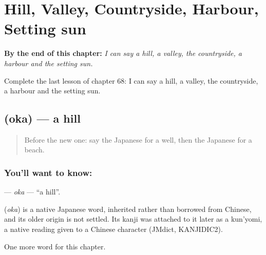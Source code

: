 
\chapter{Hill, Valley, Countryside, Harbour, Setting sun}
\label{ch:ja-hill-valley-countryside-harbour-setting-sun}

\begin{chapteropening}
\textbf{By the end of this chapter:} \emph{I can say a hill, a valley, the countryside, a harbour and the setting sun.}

Complete the last lesson of chapter 68: I can say a hill, a valley, the countryside, a harbour and the setting sun.
\end{chapteropening}

\section[\texorpdfstring{\ja{おか} (oka)}{おか (oka)}]{ (oka) — a hill}

\label{lesson:JA-C68-oka}



\begin{quote}
Before the new one: say the Japanese for a well, then the Japanese for a beach.
\end{quote}

\subsection*{You'll want to know: }
\textbf{} — \emph{oka} — \textquotedblleft{}a hill\textquotedblright{}.

\begin{cousinweb}
\textbf{} (\emph{oka}) is a native Japanese word, inherited rather than borrowed from Chinese, and its older origin is not settled. Its kanji was attached to it later as a kun'yomi, a native reading given to a Chinese character (JMdict, KANJIDIC2).
\end{cousinweb}

\begin{grammarlens}[title={What you've built}]
One more word for this chapter.
\end{grammarlens}

